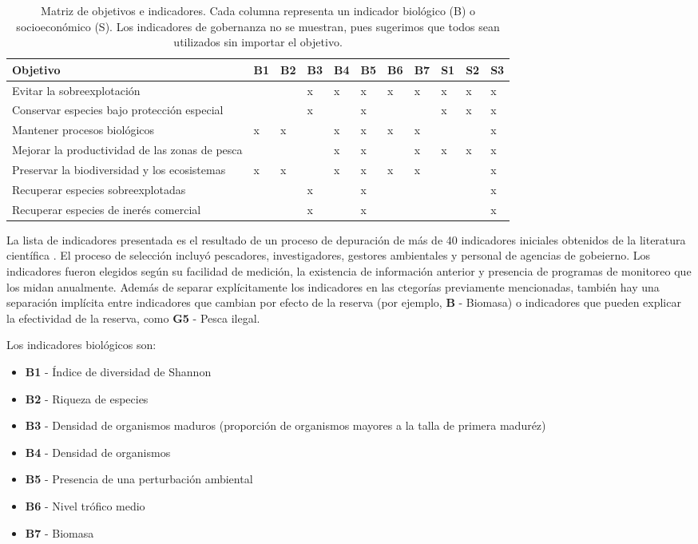 \documentclass[]{krantz}
\providecommand{\tightlist}{%
  \setlength{\itemsep}{0pt}\setlength{\parskip}{0pt}}
\begin{document}
\begin{table}

\caption{\label{tab:tabla-oi}Matriz de objetivos e indicadores. Cada columna representa un indicador biológico (B) o socioeconómico (S). Los indicadores de gobernanza no se muestran, pues sugerimos que todos sean utilizados sin importar el objetivo.}
\centering
\begin{tabular}[t]{lllllllllll}
\toprule
Objetivo & B1 & B2 & B3 & B4 & B5 & B6 & B7 & S1 & S2 & S3\\
\midrule
Evitar la sobreexplotación &  &  & x & x & x & x & x & x & x & x\\
Conservar especies bajo protección especial &  &  & x &  & x &  &  & x & x & x\\
Mantener procesos biológicos & x & x &  & x & x & x & x &  &  & x\\
Mejorar la productividad de las zonas de pesca &  &  &  & x & x &  & x & x & x & x\\
Preservar la biodiversidad y los ecosistemas & x & x &  & x & x & x & x &  &  & x\\
\addlinespace
Recuperar especies sobreexplotadas &  &  & x &  & x &  &  &  &  & x\\
Recuperar especies de inerés comercial &  &  & x &  & x &  &  &  &  & x\\
\bottomrule
\end{tabular}
\end{table}

La lista de indicadores presentada es el resultado de un proceso de
depuración de más de 40 indicadores iniciales obtenidos de la literatura
científica
\citep{halpern_2002, lester_2009, lester_2008, micheli_2012, halpern_2013, basurto_2013, leslie_2015}.
El proceso de selección incluyó pescadores, investigadores, gestores
ambientales y personal de agencias de gobeierno. Los indicadores fueron
elegidos según su facilidad de medición, la existencia de información
anterior y presencia de programas de monitoreo que los midan anualmente.
Además de separar explícitamente los indicadores en las ctegorías
previamente mencionadas, también hay una separación implícita entre
indicadores que cambian por efecto de la reserva (por ejemplo,
\textbf{B} - Biomasa) o indicadores que pueden explicar la efectividad
de la reserva, como \textbf{G5} - Pesca ilegal.

Los indicadores biológicos son:

\begin{itemize}
\tightlist
\item
  \textbf{B1} - Índice de diversidad de Shannon
\item
  \textbf{B2} - Riqueza de especies
\item
  \textbf{B3} - Densidad de organismos maduros (proporción de organismos
  mayores a la talla de primera maduréz)
\item
  \textbf{B4} - Densidad de organismos
\item
  \textbf{B5} - Presencia de una perturbación ambiental
\item
  \textbf{B6} - Nivel trófico medio
\item
  \textbf{B7} - Biomasa
\end{itemize}
\end{document}
